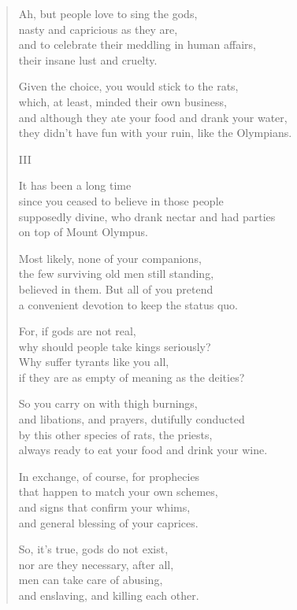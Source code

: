 \documentclass[11pt,a4paper]{article}
\begin{document}
\begin{verse}
Ah, but people love to sing the gods,\\
nasty and capricious as they are,\\
and to celebrate their meddling in human affairs,\\
their insane lust and cruelty.

Given the choice, you would stick to the rats,\\
which, at least, minded their own business,\\
and although they ate your food and drank your water,\\
they didn't have fun with your ruin, like the Olympians.

III

It has been a long time\\
since you ceased to believe in those people\\
supposedly divine, who drank nectar and had parties\\
on top of Mount Olympus.

Most likely, none of your companions,\\
the few surviving old men still standing,\\
believed in them. But all of you pretend\\
a convenient devotion to keep the status quo.

For, if gods are not real,\\
why should people take kings seriously?\\
Why suffer tyrants like you all,\\
if they are as empty of meaning as the deities?

So you carry on with thigh burnings,\\
and libations, and prayers, dutifully conducted\\
by this other species of rats, the priests,\\
always ready to eat your food and drink your wine.

In exchange, of course, for prophecies\\
that happen to match your own schemes,\\
and signs that confirm your whims,\\
and general blessing of your caprices.

So, it's true, gods do not exist,\\
nor are they necessary, after all,\\
men can take care of abusing,\\
and enslaving, and killing each other.


\end{verse}
\end{document}
